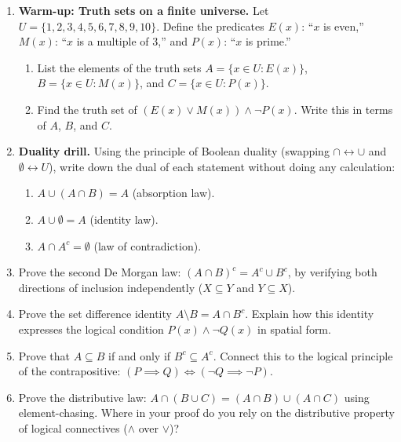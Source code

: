 \begin{enumerate}
  \item \textbf{Warm-up: Truth sets on a finite universe.} Let $U = \{1, 2, 3, 4, 5, 6, 7, 8, 9, 10\}$. Define the predicates $E(x)$: ``$x$ is even,'' $M(x)$: ``$x$ is a multiple of 3,'' and $P(x)$: ``$x$ is prime.''
  \begin{enumerate}[label=(\alph*)]
    \item List the elements of the truth sets $A = \{x \in U : E(x)\}$, $B = \{x \in U : M(x)\}$, and $C = \{x \in U : P(x)\}$.
    \item Find the truth set of $(E(x) \lor M(x)) \land \neg P(x)$. Write this in terms of $A$, $B$, and $C$.
  \end{enumerate}

  \item \textbf{Duality drill.} Using the principle of Boolean duality (swapping $\cap \leftrightarrow \cup$ and $\emptyset \leftrightarrow U$), write down the dual of each statement without doing any calculation:
  \begin{enumerate}[label=(\alph*)]
    \item $A \cup (A \cap B) = A$ (absorption law).
    \item $A \cup \emptyset = A$ (identity law).
    \item $A \cap A^c = \emptyset$ (law of contradiction).
  \end{enumerate}

  \item Prove the second De Morgan law: $(A \cap B)^c = A^c \cup B^c$, by verifying both directions of inclusion independently ($X \subseteq Y$ and $Y \subseteq X$).

  \item Prove the set difference identity $A \setminus B = A \cap B^c$. Explain how this identity expresses the logical condition $P(x) \land \neg Q(x)$ in spatial form.

  \item Prove that $A \subseteq B$ if and only if $B^c \subseteq A^c$. Connect this to the logical principle of the contrapositive: $(P \implies Q) \iff (\neg Q \implies \neg P)$.

  \item Prove the distributive law: $A \cap (B \cup C) = (A \cap B) \cup (A \cap C)$ using element-chasing. Where in your proof do you rely on the distributive property of logical connectives ($\land$ over $\lor$)?


\end{enumerate}
